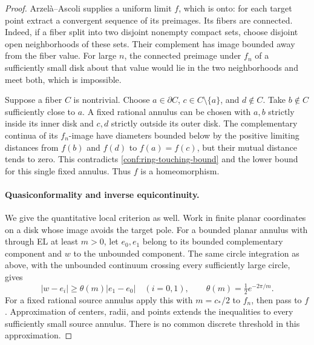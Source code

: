 \begin{proof}
Arzel\`a--Ascoli supplies a uniform limit \(f\), which is onto:
for each target point extract a convergent sequence of its
preimages.  Its fibers are connected.  Indeed, if a fiber split
into two disjoint nonempty compact sets, choose disjoint open
neighborhoods of these sets.  Their complement has image bounded
away from the fiber value.  For large \(n\), the connected
preimage under \(f_n\) of a sufficiently small disk about that
value would lie in the two neighborhoods and meet both, which is
impossible.

Suppose a fiber \(C\) is nontrivial.  Choose \(a\in\partial C\),
\(c\in C\setminus\{a\}\), and \(d\notin C\).  Take
\(b\notin C\) sufficiently close to \(a\).  A fixed rational
annulus can be chosen with \(a,b\) strictly inside its inner disk
and \(c,d\) strictly outside its outer disk.  The complementary
continua of its \(f_n\)-image have diameters bounded below by the
positive limiting distances from \(f(b)\) and \(f(d)\) to
\(f(a)=f(c)\), but their mutual distance tends to zero.  This
contradicts \eqref{conf:ring-touching-bound} and the lower bound
for this single fixed annulus.  Thus \(f\) is a homeomorphism.

\paragraph{Quasiconformality and inverse equicontinuity.}
We give the quantitative local criterion as well.  Work in finite
planar coordinates on a disk whose image avoids the target pole.
For a bounded planar annulus with through EL at least \(m>0\),
let \(e_0,e_1\) belong to its bounded complementary component and
\(w\) to the unbounded component.  The same circle integration
as above, with the unbounded continuum crossing every sufficiently
large circle, gives
\begin{equation}
 |w-e_i|\ge \theta(m)|e_1-e_0|\quad(i=0,1),
 \qquad \theta(m)=\tfrac12 e^{-2\pi/m}.
 \label{conf:relative-ring}
\end{equation}
For a fixed rational source annulus apply this with \(m=c_*/2\)
to \(f_n\), then pass to \(f\).  Approximation of centers,
radii, and points extends the inequalities to every sufficiently
small source annulus.  There is no common discrete threshold in
this approximation.


\end{proof}
